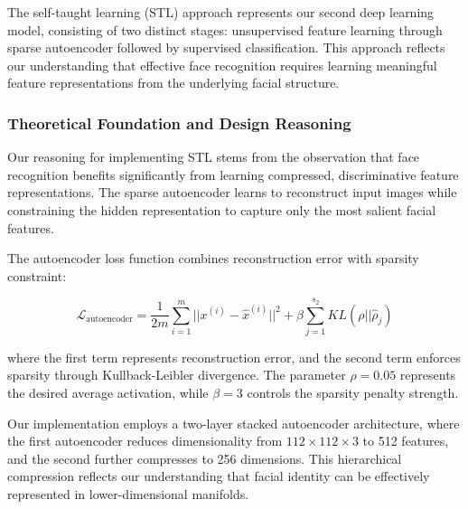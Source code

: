 \documentclass[11pt]{article}
\begin{document}
The self-taught learning (STL) approach represents our second deep learning model, consisting of two distinct stages: unsupervised feature learning through sparse autoencoder followed by supervised classification. This approach reflects our understanding that effective face recognition requires learning meaningful feature representations from the underlying facial structure.

\subsubsection{Theoretical Foundation and Design Reasoning}

Our reasoning for implementing STL stems from the observation that face recognition benefits significantly from learning compressed, discriminative feature representations. The sparse autoencoder learns to reconstruct input images while constraining the hidden representation to capture only the most salient facial features.

The autoencoder loss function combines reconstruction error with sparsity constraint:

\begin{equation}
\mathcal{L}_{\text{autoencoder}} = \frac{1}{2m} \sum_{i=1}^{m} ||x^{(i)} - \hat{x}^{(i)}||^2 + \beta \sum_{j=1}^{s_2} KL(\rho || \hat{\rho}_j)
\end{equation}

where the first term represents reconstruction error, and the second term enforces sparsity through Kullback-Leibler divergence. The parameter $\rho = 0.05$ represents the desired average activation, while $\beta = 3$ controls the sparsity penalty strength.

Our implementation employs a two-layer stacked autoencoder architecture, where the first autoencoder reduces dimensionality from $112 \times 112 \times 3$ to 512 features, and the second further compresses to 256 dimensions. This hierarchical compression reflects our understanding that facial identity can be effectively represented in lower-dimensional manifolds.
\end{document}
